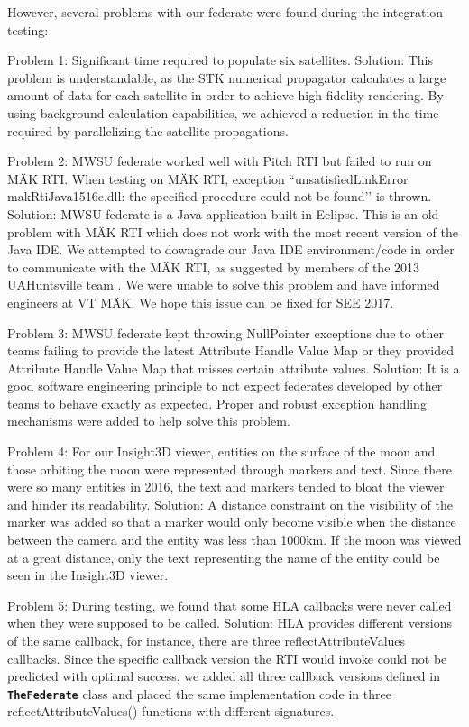 \documentclass[journal, onecolumn]{IEEEtran}
\newcommand\uml[1]{\texttt{\textbf{#1}}}
\begin{document}
However, several problems with our federate were found during the integration testing:

Problem 1: Significant time required to populate six satellites.
Solution: This problem is understandable, as the STK numerical propagator calculates a large amount of data for each satellite in order to achieve high fidelity rendering.  By using background calculation capabilities, we achieved a reduction in the time required by parallelizing the satellite propagations.

Problem 2: MWSU federate worked well with Pitch RTI but failed to run on M{\"A}K RTI. When testing on M{\"A}K RTI, exception ``unsatisfiedLinkError makRtiJava1516e.dll: the specified procedure could not be found\rq\rq{} is thrown.
Solution: MWSU federate is a Java application built in Eclipse. This is an old problem with M{\"A}K RTI which does not work with the most recent version of the Java IDE. We attempted to downgrade our Java IDE environment/code in order to communicate with the M{\"A}K RTI, as suggested by members of the 2013 UAHuntsville team \cite{bulgatz2012design}. We were unable to solve this problem and have informed engineers at VT M{\"A}K. We hope this issue can be fixed for SEE 2017.

Problem 3: MWSU federate kept throwing NullPointer exceptions due to other teams failing to provide the latest Attribute Handle Value Map or they provided Attribute Handle Value Map that misses certain attribute values.
Solution: It is a good software engineering principle to not expect federates developed by other teams to behave exactly as expected. Proper and robust exception handling mechanisms were added to help solve this problem.

Problem 4: For our Insight3D viewer, entities on the surface of the moon and those orbiting the moon were represented through markers and text. Since there were so many entities in 2016, the text and markers tended to bloat the viewer and hinder its readability.
Solution: A distance constraint on the visibility of the marker was added so that a marker would only become visible when the distance between the camera and the entity was less than 1000km. If the moon was viewed at a great distance, only the text representing the name of the entity could be seen in the Insight3D viewer.

Problem 5: During testing, we found that some HLA callbacks were never called when they were supposed to be called.
Solution: HLA provides different versions of the same callback, for instance, there are three reflectAttributeValues callbacks. Since the specific callback version the RTI would invoke could not be predicted with optimal success, we added all three callback versions defined in \uml{TheFederate} class and placed the same implementation code in three reflectAttributeValues() functions with different signatures.
 
\end{document}
